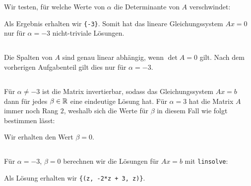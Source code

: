 \section{}





\subsection{}

Wir testen, für welche Werte von $\alpha$ die Determinante von $A$ verschwindet:



Als Ergebnis erhalten wir \texttt{\{-3\}}.
Somit hat das lineare Gleichungssystem $Ax = 0$ nur für $\alpha = -3$ nicht-triviale Lösungen.





\subsection{}

Die Spalten von $A$ sind genau linear abhängig, wenn $\det A = 0$ gilt.
Nach dem vorherigen Aufgabenteil gilt dies nur für $\alpha = -3$.





\subsection{}

Für $\alpha \neq -3$ ist die Matrix invertierbar, sodass das Gleichungssystem $Ax = b$ dann für jedes $\beta \in \mathbb{R}$ eine eindeutige Lösung hat.
Für $\alpha = 3$ hat die Matrix $A$ immer noch Rang $2$, weshalb sich die Werte für $\beta$ in diesem Fall wie folgt bestimmen lässt:



Wir erhalten den Wert $\beta = 0$.





\subsection{}

Für $\alpha = -3$, $\beta = 0$ berechnen wir die Lösungen für $Ax = b$ mit \texttt{linsolve}:



Als Lösung erhalten wir \texttt{\{(z, -2*z + 3, z)\}}.










